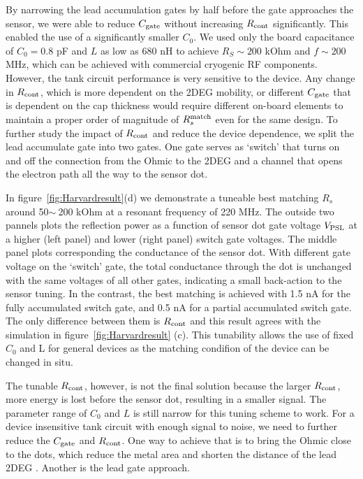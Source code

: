 \documentclass[twocolumn]{article}
\begin{document}
	By narrowing the lead accumulation gates by half before the gate approaches the sensor, we were able to reduce $C_{\rm gate}$ without increasing $R_{\rm cont}$ significantly.  This enabled the use of a significantly smaller $C_0$. We used only the board capacitance of $C_0 = 0.8$ pF and $L$ as low as 680 nH to achieve $R_S\sim 200$ kOhm and $f\sim 200$ MHz, which can be achieved with commercial cryogenic RF components. 	
	However, the tank circuit performance is very sensitive to the device. Any change in $R_{\rm cont}$, which is more dependent on the 2DEG mobility, or different $C_{\rm gate}$ that is dependent on the cap thickness would require different on-board elements to maintain a proper order of magnitude of $R^{\rm match}_s$ even for the same design. To further study the impact of $R_{\rm cont}$ and reduce the device dependence, we split the lead accumulate gate into two gates. One gate serves as ‘switch’ that turns on and off the connection from the Ohmic to the 2DEG and a channel that opens the electron path all the way to the sensor dot.
	
	In figure\ \ref{fig:Harvardresult}(d) we demonstrate a tuneable best matching $R_s$ around 50$\sim~$200 kOhm at a resonant frequency of 220 MHz. The outside two pannels plots the reflection power as a function of sensor dot gate voltage $V_{\rm PSL}$ at a higher (left panel) and lower (right panel) switch gate voltages. The middle panel plots corresponding the conductance of the sensor dot. With different gate voltage on the ‘switch’ gate, the total conductance through the dot is unchanged with the same voltages of all other gates, indicating a small back-action to the sensor tuning. In the contrast, the best matching is achieved with 1.5 nA for the fully accumulated switch gate, and 0.5 nA for a partial accumulated switch gate. The only difference between them is $R_{\rm cont}$ and this result agrees with the simulation in figure\ \ref{fig:Harvardresult} (c). This tunability allows the use of fixed $C_0$ and L for general devices as the matching condifion of the device can be changed in situ.
	
	The tunable $R_{\rm cont}$, however, is not the final solution because the larger $R_{\rm cont}$, more energy is lost before the sensor dot, resulting in a smaller signal. The parameter range of $C_0$ and $L$ is still narrow for this tuning scheme to work. For a device insensitive tank circuit with enough signal to noise, we need to further reduce the $C_{\rm gate}$ and $R_{\rm cont}$. One way to achieve that is to bring the Ohmic close to the dots, which reduce the metal area and shorten the distance of the lead 2DEG \cite{Connors2020}. Another is the lead gate approach.
\end{document}
